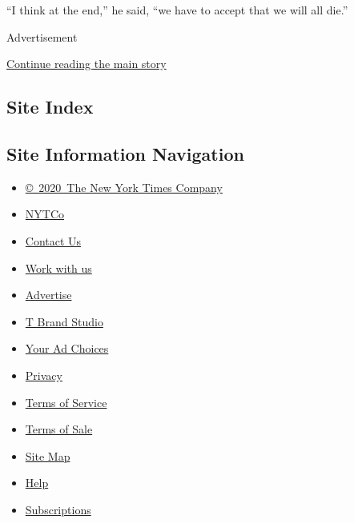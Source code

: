 ``I think at the end,'' he said, ``we have to accept that we will all
die.''

Advertisement

\protect\hyperlink{after-bottom}{Continue reading the main story}

\hypertarget{site-index}{%
\subsection{Site Index}\label{site-index}}

\hypertarget{site-information-navigation}{%
\subsection{Site Information
Navigation}\label{site-information-navigation}}

\begin{itemize}
\tightlist
\item
  \href{https://help.nytimes3xbfgragh.onion/hc/en-us/articles/115014792127-Copyright-notice}{©~2020~The
  New York Times Company}
\end{itemize}

\begin{itemize}
\tightlist
\item
  \href{https://www.nytco.com/}{NYTCo}
\item
  \href{https://help.nytimes3xbfgragh.onion/hc/en-us/articles/115015385887-Contact-Us}{Contact
  Us}
\item
  \href{https://www.nytco.com/careers/}{Work with us}
\item
  \href{https://nytmediakit.com/}{Advertise}
\item
  \href{http://www.tbrandstudio.com/}{T Brand Studio}
\item
  \href{https://www.nytimes3xbfgragh.onion/privacy/cookie-policy\#how-do-i-manage-trackers}{Your
  Ad Choices}
\item
  \href{https://www.nytimes3xbfgragh.onion/privacy}{Privacy}
\item
  \href{https://help.nytimes3xbfgragh.onion/hc/en-us/articles/115014893428-Terms-of-service}{Terms
  of Service}
\item
  \href{https://help.nytimes3xbfgragh.onion/hc/en-us/articles/115014893968-Terms-of-sale}{Terms
  of Sale}
\item
  \href{https://spiderbites.nytimes3xbfgragh.onion}{Site Map}
\item
  \href{https://help.nytimes3xbfgragh.onion/hc/en-us}{Help}
\item
  \href{https://www.nytimes3xbfgragh.onion/subscription?campaignId=37WXW}{Subscriptions}
\end{itemize}
